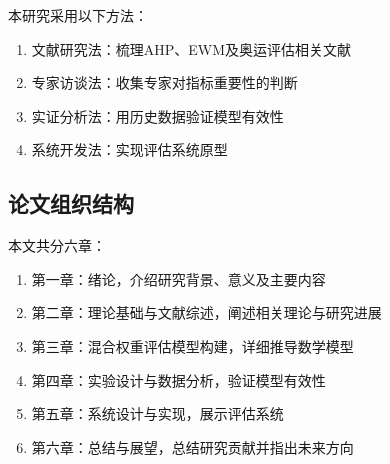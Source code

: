 本研究采用以下方法：
\begin{enumerate}
\item 文献研究法：梳理AHP、EWM及奥运评估相关文献
\item 专家访谈法：收集专家对指标重要性的判断
\item 实证分析法：用历史数据验证模型有效性
\item 系统开发法：实现评估系统原型
\end{enumerate}

\subsection{论文组织结构}

本文共分六章：
\begin{enumerate}
\item 第一章：绪论，介绍研究背景、意义及主要内容
\item 第二章：理论基础与文献综述，阐述相关理论与研究进展
\item 第三章：混合权重评估模型构建，详细推导数学模型
\item 第四章：实验设计与数据分析，验证模型有效性
\item 第五章：系统设计与实现，展示评估系统
\item 第六章：总结与展望，总结研究贡献并指出未来方向
\end{enumerate}